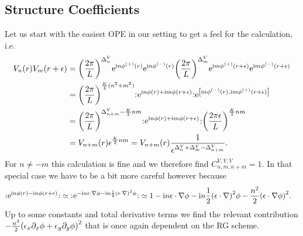 \documentclass[english, parskip=full]{scrartcl}
\begin{document}
\subsection{Structure Coefficients}
Let us start with the easiest OPE in our setting to get a feel for the calculation, i.e. 
\begin{align}
V_n(r) V_m(r+\epsilon) &= \kla*{\frac{2\pi}{L}}^{\Delta^V_n} \powe{\i n\phi^{(+)}(r)} \powe{\i n\phi^{(-)}(r)} \kla*{\frac{2\pi}{L}}^{\Delta^V_m} \powe{\i m\phi^{(+)}(r+\epsilon)} \powe{\i m\phi^{(-)}(r+\epsilon)}\\
&= \kla*{\frac{2\pi}{L}}^{\frac{K}{4}(n^2+m^2)} \normord{\powe{\i n\phi(r) + \i m\phi(r+\epsilon)}} \powe{\klb*{\i n\phi^{(-)}(r), \i m\phi^{(+)}(r+\epsilon)}} \\
&= \kla*{\frac{2\pi}{L}}^{\Delta^V_{n+m} - \frac{K}{2}nm} \normord{\powe{\i n\phi(r) + \i m\phi(r+\epsilon)}} \kla*{\frac{2\pi\epsilon}{L}}^{\frac{K}{2}nm}\\
&= V_{n+m}(r) \epsilon^{\frac{K}{2}nm} = V_{n+m}(r) \frac{1}{\epsilon^{\Delta^V_{n} + \Delta^V_{m} - \Delta^V_{n+m}}}.
\end{align}
For $n\neq -m$ this calculation is fine and we therefore find $C^{V,V,V}_{n,m,n+m}=1$.
In that special case we have to be a bit more careful however because
\begin{align}
\normord{\powe{\i n\phi(r) - \i n\phi(r+\epsilon)}} &\simeq \normord{\powe{-\i n\epsilon\cdot\nabla\phi - \i n \frac{1}{2} \kla*{\epsilon\cdot\nabla}^2\phi}} \simeq 1 - \i n \epsilon\cdot \nabla\phi - \i n \frac{1}{2} \kla*{\epsilon\cdot \nabla}^2\phi - \frac{n^2}{2} \kla*{\epsilon\cdot \nabla\phi}^2.
\end{align}
Up to some constants and total derivative terms we find the relevant contribution $-\frac{n^2}{2} \kla*{\epsilon_x \partial_x\phi + \epsilon_y\partial_y\phi}^2$ that is once again dependent on the RG scheme.
\end{document}
